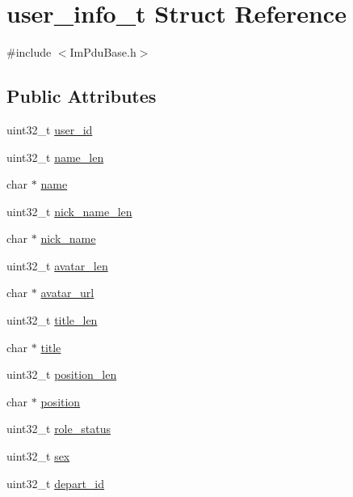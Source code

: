 \hypertarget{structuser__info__t}{}\section{user\+\_\+info\+\_\+t Struct Reference}
\label{structuser__info__t}


{\ttfamily \#include $<$Im\+Pdu\+Base.\+h$>$}

\subsection*{Public Attributes}
\begin{DoxyCompactItemize}
\item 
uint32\+\_\+t \hyperlink{structuser__info__t_ae3a04b7cdef9403c5ad87d77ed17215c}{user\+\_\+id}
\item 
uint32\+\_\+t \hyperlink{structuser__info__t_adf44cdea6e1d2518236ae36af457669b}{name\+\_\+len}
\item 
char $\ast$ \hyperlink{structuser__info__t_acc090e341793f4f9675a78599d1e12e9}{name}
\item 
uint32\+\_\+t \hyperlink{structuser__info__t_a506184e02fb979c06ace264d6dd1d5f7}{nick\+\_\+name\+\_\+len}
\item 
char $\ast$ \hyperlink{structuser__info__t_ae692fce7eae6d70a28a820d9fd2deddd}{nick\+\_\+name}
\item 
uint32\+\_\+t \hyperlink{structuser__info__t_aa9ea772df5cf874e213e3c8ab06d8886}{avatar\+\_\+len}
\item 
char $\ast$ \hyperlink{structuser__info__t_ab6efc5f97c3552b683f4fe22e0f4c152}{avatar\+\_\+url}
\item 
uint32\+\_\+t \hyperlink{structuser__info__t_ae216257d72481b758be84eb481b30b48}{title\+\_\+len}
\item 
char $\ast$ \hyperlink{structuser__info__t_a705278966eaa9c4f81a3256f76667f1e}{title}
\item 
uint32\+\_\+t \hyperlink{structuser__info__t_acb6b5b800dc8ece394913a3f48e6f3d4}{position\+\_\+len}
\item 
char $\ast$ \hyperlink{structuser__info__t_a80b070271d35b2f08b77fae82765090d}{position}
\item 
uint32\+\_\+t \hyperlink{structuser__info__t_ac82ee5a3e92363f68b1933c96c4fb4a8}{role\+\_\+status}
\item 
uint32\+\_\+t \hyperlink{structuser__info__t_add316eafd3c9d2635343a37a36580148}{sex}
\item 
uint32\+\_\+t \hyperlink{structuser__info__t_a92a9655fd1734f71e3b51c4ebfd31684}{depart\+\_\+id}

\end{DoxyCompactItemize}

